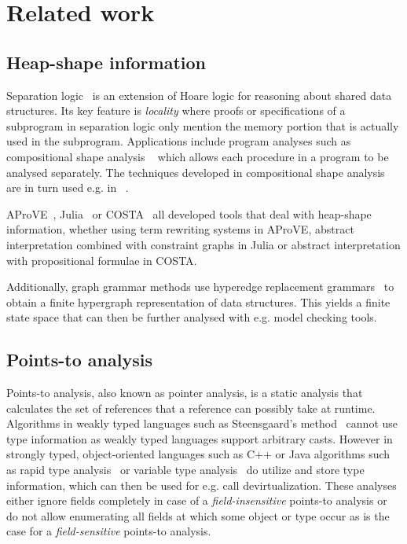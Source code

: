 \chapter{Related work}
\label{chap:related}
\section{Heap-shape information}
Separation logic~\cite{Reynolds:2002:SLL:645683.664578} is an extension of Hoare logic for reasoning about shared data structures. Its key feature is \emph{locality} where proofs or specifications of a subprogram in separation logic only mention the memory portion that is actually used in the subprogram. Applications include program analyses such as compositional shape analysis ~\cite{Calcagno:2009:CSA:1594834.1480917} which allows each procedure in a program to be analysed separately. The techniques developed in compositional shape analysis are in turn used e.g. in ~\cite{fbinfer}.

AProVE~\cite{automated-termination-proofs-for-java-bytecode-with-cyclic-data}, Julia~\cite{DBLP:journals/scp/ScapinS14} or COSTA~\cite{GenaimZ13} all developed tools that deal with heap-shape information, whether using term rewriting systems in AProVE, abstract interpretation combined with constraint graphs in Julia or abstract interpretation with propositional formulae in COSTA.

Additionally, graph grammar methods use hyperedge replacement grammars~\cite{Heinen2015157} to obtain a finite hypergraph representation of data structures. This yields a finite state space that can then be further analysed with e.g. model checking tools.

\section{Points-to analysis}
Points-to analysis, also known as pointer analysis, is a static analysis that calculates the set of references that a reference can possibly take at runtime. Algorithms in weakly typed languages such as Steensgaard's method~\cite{Steensgaard:1996:PAA:237721.237727} cannot use type information as weakly typed languages support arbitrary casts. However in strongly typed, object-oriented languages such as C++ or Java algorithms such as rapid type analysis~\cite{Bacon:1996:FSA:236338.236371} or variable type analysis~\cite{Sundaresan:2000:PVM:354222.353189} do utilize and store type information, which can then be used for e.g. call devirtualization. These analyses either ignore fields completely in case of a \emph{field-insensitive} points-to analysis or do not allow enumerating all fields at which some object or type occur as is the case for a \emph{field-sensitive} points-to analysis.